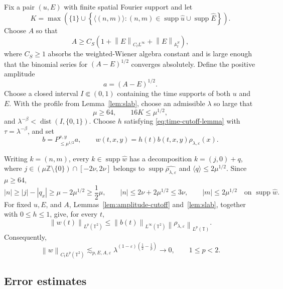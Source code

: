 \documentclass[12pt,reqno,letterpaper]{amsart}
\numberwithin{equation}{section}
\theoremstyle{definition}
\newcommand{\T}{\mathbb T}
\newcommand{\Z}{\mathbb Z}
\newcommand{\A}{\mathbb A}
\newcommand{\eps}{\varepsilon}
\newcommand{\la}{\lambda}
\newcommand{\supp}{\operatorname{supp}}
\newcommand{\norm}[1]{\left\lVert #1\right\rVert}
\newcommand{\abs}[1]{\left\lvert #1\right\rvert}
\begin{document}
Fix a pair $(u,E)$ with finite spatial Fourier support and let
\[
   K=\max\left(\{1\}\cup\left\{\langle(n,m)\rangle:
       (n,m)\in\supp\widehat u\cup\supp\widehat E\right\}\right).
\]
Choose $A$ so that
\begin{equation}\label{eq:Achoice}
    A\geq C_S\left(1+\norm{E}_{C_tL^\infty}
                         +\norm{E}_{\A^S_t}\right),
\end{equation}
where $C_S\geq1$ absorbs the weighted-Wiener algebra constant and is large enough
that the binomial series for $(A-E)^{1/2}$ converges absolutely.
Define the positive amplitude
\[
    a=(A-E)^{1/2}.
\]
Choose a closed interval $I\Subset(0,1)$ containing the time supports of
both $u$ and $E$.  With the profile from Lemma~\ref{lem:slab}, choose an
admissible $\la$ so large that
\begin{equation}\label{eq:periodic-frequency-separation}
    \mu\geq64,
    \qquad 16K\leq\mu^{1/2},
\end{equation}
and $\la^{-\beta}<\operatorname{dist}(I,\{0,1\})$.  Choose $h$ satisfying
\eqref{eq:time-cutoff-lemma} with $\tau=\la^{-\beta}$, and
set
\begin{equation}\label{eq:increment}
    b=P_{\leq\mu^{1/2}}^{x,y}a,
    \qquad
    w(t,x,y)=h(t)b(t,x,y)\rho_{\la,\eps}(x).
\end{equation}

Writing $k=(n,m)$, every $k\in\supp\widehat w$ has a decomposition
$k=(j,0)+q$, where
$j\in(\mu\Z\setminus\{0\})\cap[-2\nu,2\nu]$ belongs to
$\supp\widehat{\rho_{\la,\eps}}$ and
$\langle q\rangle\leq2\mu^{1/2}$.  Since $\mu\geq64$,
\begin{equation}\label{eq:wsupport}
 \abs n\geq\abs j-\abs{q_x}
      \geq\mu-2\mu^{1/2}\geq\frac12\mu,
 \qquad
 \abs n\leq2\nu+2\mu^{1/2}\leq3\nu,
 \qquad
 \abs m\leq2\mu^{1/2}
 \quad\text{on }\supp\widehat w.
\end{equation}
For fixed $u,E$, and $A$,
Lemmas~\ref{lem:amplitude-cutoff} and~\ref{lem:slab}, together with
$0\leq h\leq1$, give, for every $t$,
\[
  \norm{w(t)}_{L^p(\T^2)}
  \leq\norm{b(t)}_{L^\infty(\T^2)}
       \norm{\rho_{\la,\eps}}_{L^p(\T)}.
\]
Consequently,
\begin{equation}\label{eq:wLp}
    \norm{w}_{C_tL^p(\T^2)}
    \lesssim_{p,E,A,\eps}
    \la^{(1-\eps)(\frac12-\frac1p)}
    \longrightarrow0,
    \qquad 1\leq p<2.
\end{equation}

\subsection{Error estimates}
\end{document}
